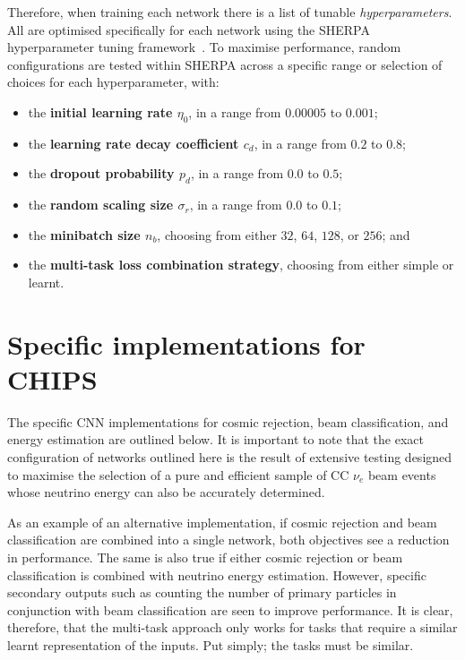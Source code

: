 Therefore, when training each network there is a list of tunable \emph{hyperparameters}. All are
optimised specifically for each network using the SHERPA hyperparameter tuning
framework~\cite{hertel2020}. To maximise performance, random configurations are tested within
SHERPA across a specific range or selection of choices for each hyperparameter, with:
\begin{itemize}
    \item the \textbf{initial learning rate $\eta_{0}$}, in a range from $0.00005$ to $0.001$;
    \item the \textbf{learning rate decay coefficient $c_{d}$}, in a range from $0.2$ to $0.8$;
    \item the \textbf{dropout probability $p_{d}$}, in a range from $0.0$ to $0.5$;
    \item the \textbf{random scaling size $\sigma_{r}$}, in a range from $0.0$ to $0.1$;
    \item the \textbf{minibatch size $n_{b}$}, choosing from either $32$, $64$, $128$, or $256$;
    and
    \item the \textbf{multi-task loss combination strategy}, choosing from either simple or
    learnt.
\end{itemize}

\section{Specific implementations for CHIPS} %
\label{sec:cnn_specific} %

The specific CNN implementations for cosmic rejection, beam classification, and energy estimation
are outlined below. It is important to note that the exact configuration of networks outlined here
is the result of extensive testing designed to maximise the selection of a pure and efficient
sample of CC $\nu_{e}$ beam events whose neutrino energy can also be accurately determined.

As an example of an alternative implementation, if cosmic rejection and beam classification are
combined into a single network, both objectives see a reduction in performance. The same is also
true if either cosmic rejection or beam classification is combined with neutrino energy
estimation. However, specific secondary outputs such as counting the number of primary particles
in conjunction with beam classification are seen to improve performance. It is clear, therefore,
that the multi-task approach only works for tasks that require a similar learnt representation of
the inputs. Put simply; the tasks must be similar.

